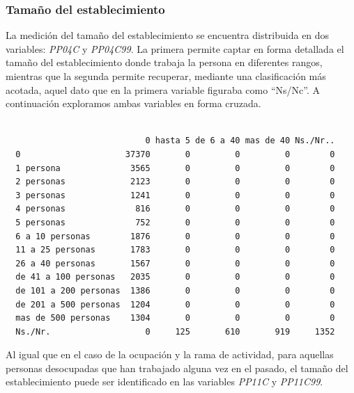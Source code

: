 \documentclass[
]{article}
\newenvironment{Shaded}{\begin{snugshade}}{\end{snugshade}}
\newcommand{\FunctionTok}[1]{\textcolor[rgb]{0.13,0.29,0.53}{\textbf{#1}}}
\newcommand{\NormalTok}[1]{#1}
\newcommand{\SpecialCharTok}[1]{\textcolor[rgb]{0.81,0.36,0.00}{\textbf{#1}}}
\begin{document}
\hypertarget{tamauxf1o-del-establecimiento-1}{%
\subsubsection{Tamaño del establecimiento}\label{tamauxf1o-del-establecimiento-1}}

La medición del tamaño del establecimiento se encuentra distribuida en dos variables: \emph{PP04C} y \emph{PP04C99}. La primera permite captar en forma detallada el tamaño del establecimiento donde trabaja la persona en diferentes rangos, mientras que la segunda permite recuperar, mediante una clasificación más acotada, aquel dato que en la primera variable figuraba como ``Ns/Nc''. A continuación exploramos ambas variables en forma cruzada.

\begin{Shaded}
\end{Shaded}

\begin{verbatim}
                       
                            0 hasta 5 de 6 a 40 mas de 40 Ns./Nr..
  0                     37370       0         0         0        0
  1 persona              3565       0         0         0        0
  2 personas             2123       0         0         0        0
  3 personas             1241       0         0         0        0
  4 personas              816       0         0         0        0
  5 personas              752       0         0         0        0
  6 a 10 personas        1876       0         0         0        0
  11 a 25 personas       1783       0         0         0        0
  26 a 40 personas       1567       0         0         0        0
  de 41 a 100 personas   2035       0         0         0        0
  de 101 a 200 personas  1386       0         0         0        0
  de 201 a 500 personas  1204       0         0         0        0
  mas de 500 personas    1304       0         0         0        0
  Ns./Nr.                   0     125       610       919     1352
\end{verbatim}

Al igual que en el caso de la ocupación y la rama de actividad, para aquellas personas desocupadas que han trabajado alguna vez en el pasado, el tamaño del establecimiento puede ser identificado en las variables \emph{PP11C} y \emph{PP11C99}.
\end{document}
